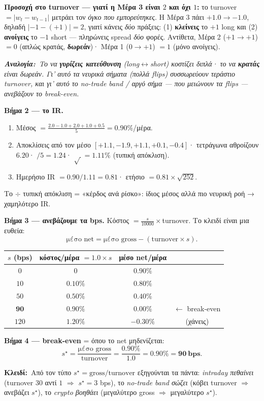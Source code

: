 \documentclass[11pt]{article}
\newcommand{\key}[1]{\par\medskip\noindent\colorbox{soft}{\parbox{\dimexpr\linewidth-2\fboxsep}{\textcolor{accent}{\textbf{Κλειδί:}}\ #1}}\par\medskip}
\newcommand{\analogy}[1]{\par\smallskip\noindent\textit{\textbf{Αναλογία:}\ #1}\par\smallskip}
\begin{document}
\noindent\textbf{Προσοχή στο turnover --- γιατί η Μέρα 3 είναι $2$ και όχι $1$:} το turnover
$=|w_t-w_{t-1}|$ μετράει τον \emph{όγκο που εμπορεύτηκες}. Η Μέρα 3 πάει $+1.0\to-1.0$, δηλαδή
$|-1-(+1)|=2$, γιατί κάνεις \emph{δύο} πράξεις: (1) \textbf{κλείνεις} το $+1$ long και (2)
\textbf{ανοίγεις} το $-1$ short --- πληρώνεις spread \emph{δύο} φορές. Αντίθετα, Μέρα 2 ($+1\to+1$)
$=0$ (απλώς κρατάς, \textbf{δωρεάν})· Μέρα 1 ($0\to+1$) $=1$ (μόνο ανοίγεις).
\analogy{Το να \textbf{γυρίζεις κατεύθυνση} (long$\leftrightarrow$short) κοστίζει \emph{διπλά}· το να
\textbf{κρατάς} είναι δωρεάν. Γι' αυτό τα νευρικά σήματα (πολλά flips) συσσωρεύουν τεράστιο turnover,
και γι' αυτό το no-trade band / αργό σήμα --- που μειώνουν τα flips --- ανεβάζουν το break-even.}

\textbf{Βήμα 2 --- το IR.}
\begin{enumerate}[leftmargin=1.5em,nosep]
\item Μέσος $=\frac{2.0-1.0+2.0+1.0+0.5}{5}=\mathbf{0.90\%}$/μέρα.
\item Αποκλίσεις από τον μέσο $[+1.1,-1.9,+1.1,+0.1,-0.4]$· τετράγωνα αθροίζουν $6.20$· $/5=1.24$·
$\sqrt{\,}=\mathbf{1.11\%}$ (τυπική απόκλιση).
\item Ημερήσιο IR $=0.90/1.11=\mathbf{0.81}$· ετήσιο $=0.81\times\sqrt{252}$.
\end{enumerate}
Το $\div$ τυπική απόκλιση = «κέρδος ανά ρίσκο»: ίδιος μέσος αλλά πιο νευρική ροή → χαμηλότερο IR.

\textbf{Βήμα 3 --- ανεβάζουμε τα bps.} Κόστος $=\frac{s}{10000}\times$turnover. Το κλειδί είναι μια ευθεία:
\[ \text{μέσο net} = \text{μέσο gross} - (\text{turnover}\times s). \]
\begin{center}\small
\begin{tabular}{cccc}
\toprule
$s$ (bps) & κόστος/μέρα $=1.0\times s$ & μέσο net/μέρα & \\
\midrule
$0$ & $0$ & $0.90\%$ & \\
$10$ & $0.10\%$ & $0.80\%$ & \\
$50$ & $0.50\%$ & $0.40\%$ & \\
$\mathbf{90}$ & $\mathbf{0.90\%}$ & $\mathbf{0.00\%}$ & $\leftarrow$ break-even \\
$120$ & $1.20\%$ & $-0.30\%$ & (χάνεις) \\
\bottomrule
\end{tabular}
\end{center}
\textbf{Βήμα 4 --- break-even} = όπου το net μηδενίζεται:
\[ s^\star=\frac{\text{μέσο gross}}{\text{turnover}}=\frac{0.90\%}{1.0}=0.90\%=\mathbf{90\ \text{bps}}. \]
\key{Από τον τύπο $s^\star=\text{gross}/\text{turnover}$ εξηγούνται τα πάντα: \emph{intraday πεθαίνει} (turnover
$30$ αντί $1$ $\Rightarrow$ $s^\star=3$ bps), το \emph{no-trade band σώζει} (κόβει turnover $\Rightarrow$
ανεβάζει $s^\star$), το \emph{crypto βοηθάει} (μεγαλύτερο gross $\Rightarrow$ μεγαλύτερο $s^\star$).}
\end{document}
